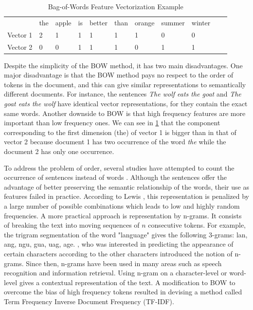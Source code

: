 \begin{table}
\centering
\caption {Bag-of-Words Feature Vectorization Example}
\begin{tabular}{l|l|l|l|l|l|l|l|l|l|l}
 & the & apple & is & better & than & orange & summer & winter \\
Vector 1 & 2 & 1 & 1 & 1 & 1 & 1 & 0 & 0 \\
Vector 2 & 0 & 0 & 1 & 1 & 1 & 0 & 1 & 1 \\
\end{tabular}
\label {tb:bow}
\end{table}


Despite the simplicity of the BOW method,  it has two main disadvantages. One major disadvantage is that the BOW method pays no respect to the order of tokens in the document, and this can give similar representations to semantically different documents. For instance, the sentences \emph{The wolf eats the goat} and \emph{The goat eats the wolf} have identical vector representations, for they contain the exact same words. Another downside to BOW is that high frequency features are more important than low frequency ones. We can see in \ref{tb:bow} that the component corresponding to the first dimension (the) of vector 1 is bigger than in that of vector 2 because document 1 has two occurrence of the word \emph{the} while the document 2 has only one occurrence. 

To address the problem of order, several studies have attempted to count the occurrence of sentences instead of words \citep{fuhr1991probabilistic, tzeras1993automatic}. Although the sentences offer the advantage of better preserving the semantic relationship of the words, their use as features failed in practice. According to Lewis \citeyear{lewis1992representation}, this representation is penalized by a large number of possible combinations which leads to low and highly
random frequencies. A more practical approach is representation by n-grams. It consists of breaking the text into moving sequences of $n$ consecutive tokens. For example, the trigram segmentation of the word "language" gives the following 3-grams: lan, ang, ngu, gua, uag, age. \citep{shannon1948mathematical}, who was interested in predicting the appearance of certain characters according to the other characters introduced the notion of n-grams. Since then, n-grams have been used in many areas such as speech recognition and information retrieval. Using n-gram on a character-level or word-level gives a contextual representation of the text. A modification to BOW to overcome the bias of high frequency tokens resulted in devising a method called Term Frequency Inverse Document Frequency (TF-IDF). 

